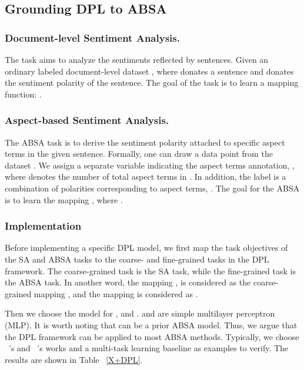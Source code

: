 \documentclass[11pt]{article}
\begin{document}
\subsection{Grounding DPL to ABSA}



\subsubsection{Document-level Sentiment Analysis.}
The task aims to analyze the sentiments reflected by sentences.
Given an ordinary labeled document-level dataset  , where  donates a sentence and  donates the sentiment polarity of the sentence.
The goal of the task is to learn a mapping function: .

\subsubsection{Aspect-based Sentiment Analysis.}
The ABSA task is to derive the sentiment polarity attached to specific aspect terms in the given sentence.
Formally, one can draw a data point  from the dataset . We assign a separate variable indicating the aspect terms annotation, , where  denotes the number of total aspect terms in .
In addition, the label  is a combination of polarities corresponding to aspect terms, .
The goal for the ABSA is to learn the mapping , where .


\subsubsection{Implementation}
Before implementing a specific DPL model, we first map the task objectives of the SA and ABSA tasks to the coarse- and fine-grained tasks in the DPL framework.
The coarse-grained task is the SA task, while the fine-grained task is the ABSA task.
In another word, the mapping , is considered as the coarse-grained mapping  , and the mapping  is considered as .

Then we choose the model for ,  and .
 and  are simple multilayer perceptron (MLP).
It is worth noting that  can be a prior ABSA model.
Thus, we argue that the DPL framework can be applied to most ABSA methods.
Typically, we choose ~\citet{bai2020investigating}'s and ~\citet{rietzler2019adapt}'s works and a multi-task learning baseline as examples to verify. The results are shown in Table ~\ref{X+DPL}.
\end{document}
